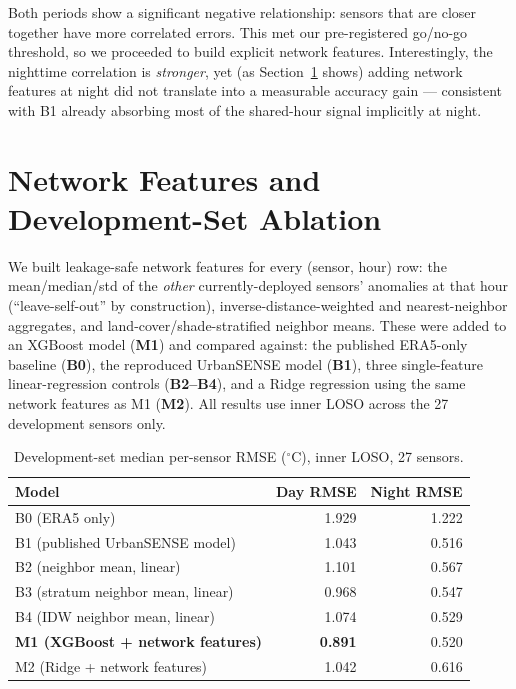 \documentclass[11pt]{article}
\begin{document}
Both periods show a significant negative relationship: sensors that are
closer together have more correlated errors. This met our pre-registered
go/no-go threshold, so we proceeded to build explicit network features.
Interestingly, the nighttime correlation is \emph{stronger}, yet (as
Section~\ref{sec:dev} shows) adding network features at night did not
translate into a measurable accuracy gain --- consistent with B1 already
absorbing most of the shared-hour signal implicitly at night.

\section{Network Features and Development-Set Ablation}
\label{sec:dev}

We built leakage-safe network features for every (sensor, hour) row: the
mean/median/std of the \emph{other} currently-deployed sensors' anomalies at
that hour (``leave-self-out'' by construction), inverse-distance-weighted
and nearest-neighbor aggregates, and land-cover/shade-stratified neighbor
means. These were added to an XGBoost model (\textbf{M1}) and compared
against: the published ERA5-only baseline (\textbf{B0}), the reproduced
UrbanSENSE model (\textbf{B1}), three single-feature linear-regression
controls (\textbf{B2--B4}), and a Ridge regression using the same network
features as M1 (\textbf{M2}). All results use inner LOSO across the 27
development sensors only.

\begin{table}[H]
  \centering
  \caption{Development-set median per-sensor RMSE ($^\circ$C), inner LOSO,
  27 sensors.}
  \label{tab:devresults}
  \begin{tabular}{lrr}
    \toprule
    Model & Day RMSE & Night RMSE \\
    \midrule
    B0 (ERA5 only)                  & 1.929 & 1.222 \\
    B1 (published UrbanSENSE model) & 1.043 & 0.516 \\
    B2 (neighbor mean, linear)      & 1.101 & 0.567 \\
    B3 (stratum neighbor mean, linear) & 0.968 & 0.547 \\
    B4 (IDW neighbor mean, linear)  & 1.074 & 0.529 \\
    \textbf{M1 (XGBoost + network features)} & \textbf{0.891} & 0.520 \\
    M2 (Ridge + network features)   & 1.042 & 0.616 \\
    \bottomrule
  \end{tabular}
\end{table}
\end{document}
